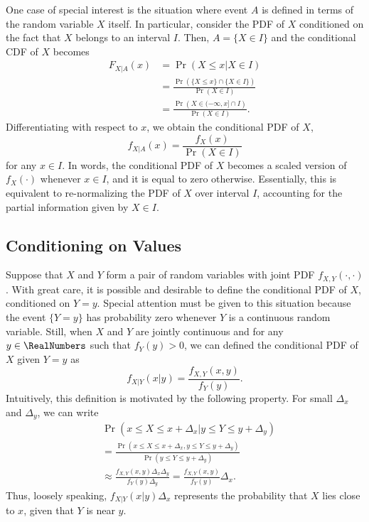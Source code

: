 One case of special interest is the situation where event $A$ is defined in terms of the random variable $X$ itself.
In particular, consider the PDF of $X$ conditioned on the fact that $X$ belongs to an interval $I$.
Then, $A = \{ X \in I \}$ and the conditional CDF of $X$ becomes
\begin{equation*}
\begin{split}
F_{X|A} (x) &= \Pr (X \leq x | X \in I) \\
&= \frac{ \Pr \left( \{ X \leq x \} \cap \{ X \in I \} \right) }{\Pr(X \in I)} \\
&= \frac{ \Pr \left( X \in (-\infty, x] \cap I \right) }{\Pr(X \in I)} .
\end{split}
\end{equation*}
Differentiating with respect to $x$, we obtain the conditional PDF of $X$,
\begin{equation*}
f_{X|A} (x) = \frac{ f_X (x) }{ \Pr (X \in I) } 
\end{equation*}
for any $x \in I$.
In words, the conditional PDF of $X$ becomes a scaled version of $f_X(\cdot)$ whenever $x \in I$, and it is equal to zero otherwise.
Essentially, this is equivalent to re-normalizing the PDF of $X$ over interval $I$, accounting for the partial information given by $X \in I$.


\subsection{Conditioning on Values}

Suppose that $X$ and $Y$ form a pair of random variables with joint PDF $f_{X,Y} (\cdot, \cdot)$.
With great care, it is possible and desirable to define the conditional PDF of $X$, conditioned on $Y = y$. 
Special attention must be given to this situation because the event $\{ Y = y \}$ has probability zero whenever $Y$ is a continuous random variable.
Still, when $X$ and $Y$ are jointly continuous and for any $y \in \RealNumbers$ such that $f_Y (y) > 0$, we can defined the conditional PDF of $X$ given $Y = y$ as
\begin{equation} \label{equation:ConditionalPDF}
f_{X|Y} (x|y) = \frac{ f_{X,Y} (x,y) }{ f_Y (y) } .
\end{equation}
Intuitively, this definition is motivated by the following property.
For small $\Delta_x$ and $\Delta_y$, we can write
\begin{equation*}
\begin{split}
&\Pr (x \leq X \leq x + \Delta_x | y \leq Y \leq y + \Delta_y) \\
&= \frac{\Pr (x \leq X \leq x + \Delta_x, y \leq Y \leq y + \Delta_y)}
{\Pr (y \leq Y \leq y + \Delta_y)} \\
&\approx \frac{f_{X,Y} (x, y) \Delta_x \Delta_y} {f_Y (y) \Delta_y}
= \frac{f_{X,Y} (x, y)}{f_Y (y)} \Delta_x .
\end{split}
\end{equation*}
Thus, loosely speaking, $f_{X|Y} (x|y) \Delta_x$ represents the probability that $X$ lies close to $x$, given that $Y$ is near $y$.

